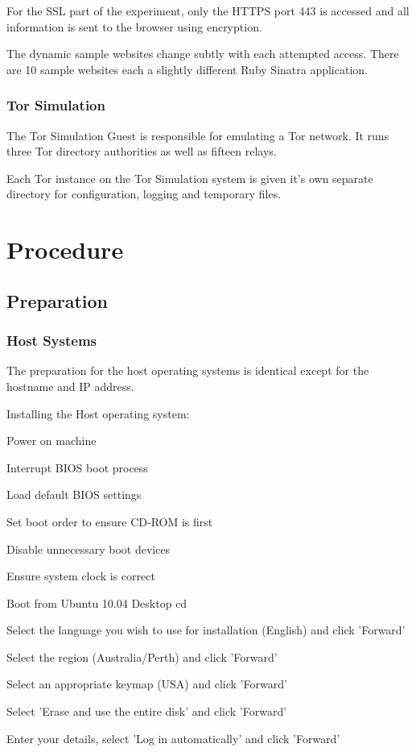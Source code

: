For the SSL part of the experiment, only the HTTPS port 443 is accessed and all information is sent to the browser using encryption.

The dynamic sample websites change subtly with each attempted access. There are 10 sample websites each a slightly different Ruby Sinatra application.

\subsubsection{Tor Simulation}

The Tor Simulation Guest is responsible for emulating a Tor network. It runs three Tor directory authorities as well as fifteen relays.

Each Tor instance on the Tor Simulation system is given it's own separate directory for configuration, logging and temporary files.

\section{Procedure}

\subsection{Preparation}

\subsubsection{Host Systems}

The preparation for the host operating systems is identical except for the hostname and IP address.

Installing the Host operating system:

\begin{enumerate*}
  \item Power on machine
  \item Interrupt BIOS boot process
  \begin{enumerate*}
    \item Load default BIOS settings
    \item Set boot order to ensure CD-ROM is first
    \item Disable unnecessary boot devices
    \item Ensure system clock is correct
  \end{enumerate*}
  \item Boot from Ubuntu 10.04 Desktop cd
  \item Select the language you wish to use for installation (English) and click 'Forward'
  \item Select the region (Australia/Perth) and click 'Forward'
  \item Select an appropriate keymap (USA) and click 'Forward'
  \item Select 'Erase and use the entire disk' and click 'Forward'
  \item Enter your details, select 'Log in automatically' and click 'Forward'
\end{enumerate*}

